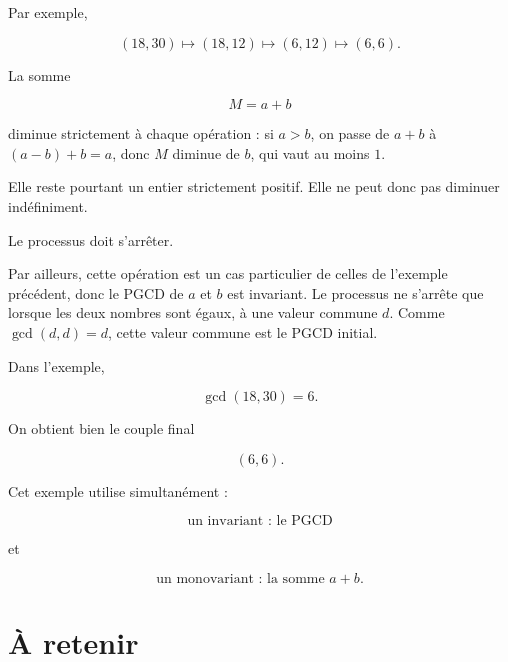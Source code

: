\documentclass[11pt]{article}
\begin{document}
Par exemple,

\[
(18,30)
\longmapsto
(18,12)
\longmapsto
(6,12)
\longmapsto
(6,6).
\]

La somme

\[
M=a+b
\]

diminue strictement à chaque opération : si \(a>b\), on passe de \(a+b\) à
\((a-b)+b=a\), donc \(M\) diminue de \(b\), qui vaut au moins \(1\).

Elle reste pourtant un entier strictement positif. Elle ne peut donc pas
diminuer indéfiniment.

Le processus doit s'arrêter.

Par ailleurs, cette opération est un cas particulier de celles de l'exemple
précédent, donc le PGCD de \(a\) et \(b\) est invariant. Le processus ne
s'arrête que lorsque les deux nombres sont égaux, à une valeur commune \(d\).
Comme \(\gcd(d,d)=d\), cette valeur commune est le PGCD initial.

Dans l'exemple,

\[
\gcd(18,30)=6.
\]

On obtient bien le couple final

\[
(6,6).
\]

Cet exemple utilise simultanément :

\[
\boxed{\text{un invariant : le PGCD}}
\]

et

\[
\boxed{\text{un monovariant : la somme \(a+b\)}}.
\]

\section{À retenir}\label{sec:retenir}
\end{document}
